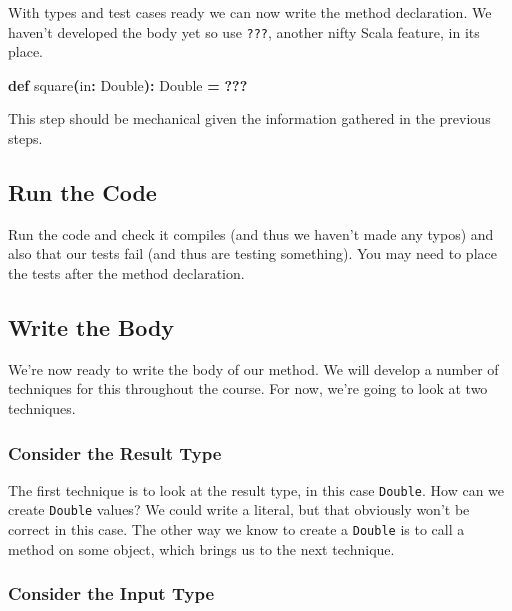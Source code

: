 \documentclass[11pt,a5paper,]{book}
\newenvironment{Shaded}{\begin{snugshade}}{\end{snugshade}}
\newcommand{\ExtensionTok}[1]{#1}
\newcommand{\FunctionTok}[1]{\textcolor[rgb]{0.00,0.00,0.00}{#1}}
\newcommand{\KeywordTok}[1]{\textcolor[rgb]{0.13,0.29,0.53}{\textbf{#1}}}
\newcommand{\NormalTok}[1]{#1}
\newcommand{\OperatorTok}[1]{\textcolor[rgb]{0.81,0.36,0.00}{\textbf{#1}}}
\begin{document}
With types and test cases ready we can now write the method declaration.
We haven't developed the body yet so use \texttt{???}, another nifty
Scala feature, in its place.

\begin{Shaded}
\begin{Highlighting}[]
\KeywordTok{def} \FunctionTok{square}\OperatorTok{(}\NormalTok{in}\OperatorTok{:} \ExtensionTok{Double}\OperatorTok{):} \ExtensionTok{Double} \OperatorTok{=}
  \OperatorTok{???}
\end{Highlighting}
\end{Shaded}

This step should be mechanical given the information gathered in the
previous steps.

\hypertarget{run-the-code}{%
\subsection{Run the Code}\label{run-the-code}}

Run the code and check it compiles (and thus we haven't made any typos)
and also that our tests fail (and thus are testing something). You may
need to place the tests after the method declaration.

\hypertarget{write-the-body}{%
\subsection{Write the Body}\label{write-the-body}}

We're now ready to write the body of our method. We will develop a
number of techniques for this throughout the course. For now, we're
going to look at two techniques.

\hypertarget{consider-the-result-type}{%
\subsubsection{Consider the Result
Type}\label{consider-the-result-type}}

The first technique is to look at the result type, in this case
\texttt{Double}. How can we create \texttt{Double} values? We could
write a literal, but that obviously won't be correct in this case. The
other way we know to create a \texttt{Double} is to call a method on
some object, which brings us to the next technique.

\hypertarget{consider-the-input-type}{%
\subsubsection{Consider the Input Type}\label{consider-the-input-type}}
\end{document}
